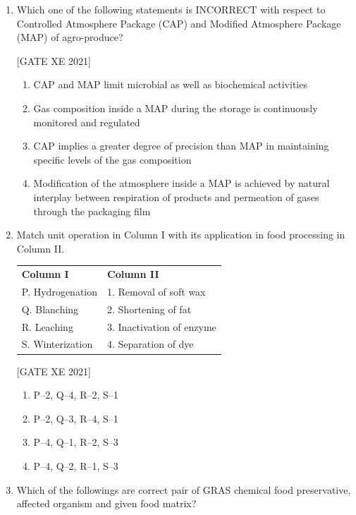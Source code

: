 \documentclass[journal,12pt,onecolumn]{IEEEtran}
\theoremstyle{remark}
\begin{document}
\begin{enumerate}[resume]
\item Which one of the following statements is INCORRECT with respect to Controlled Atmosphere Package (CAP) and Modified Atmosphere Package (MAP) of agro-produce?

\hfill[GATE XE 2021]


\begin{enumerate}
\item CAP and MAP limit microbial as well as biochemical activities
\item Gas composition inside a MAP during the storage is continuously monitored and regulated
\item CAP implies a greater degree of precision than MAP in maintaining specific levels of the gas composition
\item Modification of the atmosphere inside a MAP is achieved by natural interplay between respiration of products and permeation of gases through the packaging film
\end{enumerate}



\item Match unit operation in Column I with its application in food processing in Column II.

\begin{center}
\begin{tabular}{p{6cm} p{6cm}}
\textbf{Column I} & \textbf{Column II} \\
P. Hydrogenation & 1. Removal of soft wax \\
Q. Blanching & 2. Shortening of fat \\
R. Leaching & 3. Inactivation of enzyme \\
S. Winterization & 4. Separation of dye \\
\end{tabular}
\end{center}

\hfill[GATE XE 2021]

\begin{multicols}{2}
\begin{enumerate}
\item P–2, Q–4, R–2, S–1
\item P–2, Q–3, R–4, S–1
\item P–4, Q–1, R–2, S–3
\item P–4, Q–2, R–1, S–3
\end{enumerate}
\end{multicols}
\item Which of the followings are correct pair of GRAS chemical food preservative, affected organism and given food matrix?


\end{enumerate}
\end{document}
